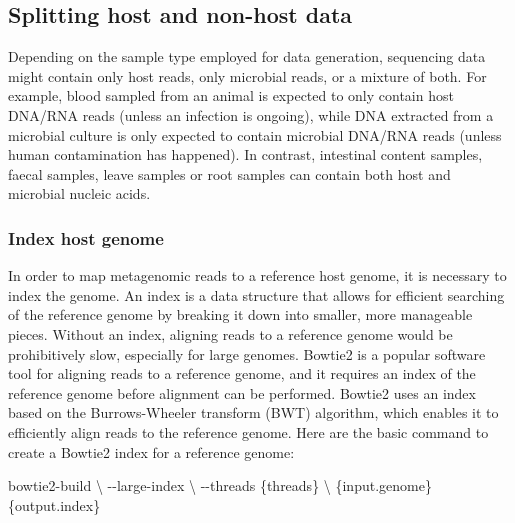 \documentclass[
]{book}
\newenvironment{Shaded}{\begin{snugshade}}{\end{snugshade}}
\newcommand{\AttributeTok}[1]{\textcolor[rgb]{0.77,0.63,0.00}{#1}}
\newcommand{\DataTypeTok}[1]{\textcolor[rgb]{0.13,0.29,0.53}{#1}}
\newcommand{\ExtensionTok}[1]{#1}
\newcommand{\NormalTok}[1]{#1}
\begin{document}
\normalsize

\hypertarget{splitting-host-and-non-host-data}{%
\subsection*{Splitting host and non-host data}\label{splitting-host-and-non-host-data}}

Depending on the sample type employed for data generation, sequencing data might contain only host reads, only microbial reads, or a mixture of both. For example, blood sampled from an animal is expected to only contain host DNA/RNA reads (unless an infection is ongoing), while DNA extracted from a microbial culture is only expected to contain microbial DNA/RNA reads (unless human contamination has happened). In contrast, intestinal content samples, faecal samples, leave samples or root samples can contain both host and microbial nucleic acids.

\hypertarget{index-host-genome}{%
\subsubsection*{Index host genome}\label{index-host-genome}}

In order to map metagenomic reads to a reference host genome, it is necessary to index the genome. An index is a data structure that allows for efficient searching of the reference genome by breaking it down into smaller, more manageable pieces. Without an index, aligning reads to a reference genome would be prohibitively slow, especially for large genomes. Bowtie2 is a popular software tool for aligning reads to a reference genome, and it requires an index of the reference genome before alignment can be performed. Bowtie2 uses an index based on the Burrows-Wheeler transform (BWT) algorithm, which enables it to efficiently align reads to the reference genome. Here are the basic command to create a Bowtie2 index for a reference genome:

\small

\begin{Shaded}
\begin{Highlighting}[]
\ExtensionTok{bowtie2{-}build} \DataTypeTok{\textbackslash{}}
    \AttributeTok{{-}{-}large{-}index} \DataTypeTok{\textbackslash{}}
    \AttributeTok{{-}{-}threads}\NormalTok{ \{threads\} }\DataTypeTok{\textbackslash{}}
\NormalTok{        \{input.genome\} \{output.index\}}
\end{Highlighting}
\end{Shaded}
\end{document}
